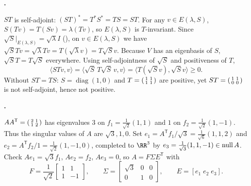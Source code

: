 \documentclass[10pt]{scrartcl}
\begin{document}
\begin{prob}
  \textbf{. }\par
  \begin{steps}
    \ii $ST$ is self-adjoint: $(ST)^*=T^*S^*=TS=ST$.
    \ii For any $v\in E(\lambda,S)$, $S(Tv)=T(Sv)=\lambda(Tv)$, so $E(\lambda,S)$ is $T$-invariant.
    \ii Since $\sqrt{S}|_{E(\lambda,S)}=\sqrt{\lambda}I$ (), on $v\in E(\lambda,S)$ we have $\sqrt{S}Tv=\sqrt{\lambda}Tv=T(\sqrt{\lambda}v)=T\sqrt{S}v$. Because $V$ has an eigenbasis of $S$, $\sqrt{S}T=T\sqrt{S}$ everywhere.
    \ii Using self-adjointness of $\sqrt{S}$ and positiveness of $T$,
    \[
      \langle STv,v\rangle = \langle\sqrt{S}\,T\sqrt{S}\,v,v\rangle = \langle T(\sqrt{S}v),\sqrt{S}v\rangle \ge 0.
    \]
    \ii Without $ST=TS$: $S=\operatorname{diag}(1,0)$ and $T=\begin{psmallmatrix}1&1\\1&1\end{psmallmatrix}$ are positive, yet $ST=\begin{psmallmatrix}1&1\\0&0\end{psmallmatrix}$ is not self-adjoint, hence not positive.
  \end{steps}
\end{prob}

\begin{prob}
  \textbf{. }\par
  \begin{steps}
    \ii $AA^{\mathsf T}=\begin{psmallmatrix}2&1\\1&2\end{psmallmatrix}$ has eigenvalues $3$ on $f_1=\frac{1}{\sqrt{2}}(1,1)$ and $1$ on $f_2=\frac{1}{\sqrt{2}}(1,-1)$. Thus the singular values of $A$ are $\sqrt{3},1,0$.
    \ii Set $e_1 = A^{\mathsf T}f_1/\sqrt{3} = \frac{1}{\sqrt{6}}(1,1,2)$ and $e_2 = A^{\mathsf T}f_2/1 = \frac{1}{\sqrt{2}}(1,-1,0)$, completed to $\RR^3$ by $e_3=\frac{1}{\sqrt{3}}(1,1,-1)\in\operatorname{null} A$.
    \ii Check $Ae_1=\sqrt{3}f_1$, $Ae_2=f_2$, $Ae_3=0$, so $A=F\Sigma E^{\mathsf T}$ with
    \[
      F = \frac{1}{\sqrt{2}}\begin{bmatrix}1&1\\1&-1\end{bmatrix},\qquad
      \Sigma = \begin{bmatrix}\sqrt{3}&0&0\\0&1&0\end{bmatrix},\qquad
      E = [e_1\;e_2\;e_3].
    \]
  \end{steps}
\end{prob}
\end{document}
